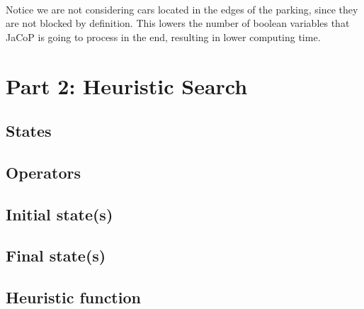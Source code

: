 \paragraph{}
Notice we are not considering cars located in the edges of the parking, since they are not blocked by definition. This lowers the number of boolean variables that JaCoP is going to process in the end, resulting in lower computing time.



\section{Part 2: Heuristic Search}

\subsection{States}

\paragraph{}

\subsection{Operators}

\paragraph{}

\subsection{Initial state(s)}

\paragraph{}

\subsection{Final state(s)}

\paragraph{}

\subsection{Heuristic function}

\paragraph{}
